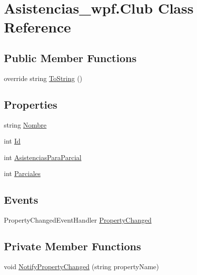 \hypertarget{class_asistencias__wpf_1_1_club}{\section{Asistencias\-\_\-wpf.\-Club Class Reference}
\label{class_asistencias__wpf_1_1_club}
}
\subsection*{Public Member Functions}
\begin{DoxyCompactItemize}
\item 
override string \hyperlink{class_asistencias__wpf_1_1_club_aa94008b53cde5a248b0149566e527ac0}{To\-String} ()
\end{DoxyCompactItemize}
\subsection*{Properties}
\begin{DoxyCompactItemize}
\item 
string \hyperlink{class_asistencias__wpf_1_1_club_a0da21bbffe8ac3d877a51c03899bf8c2}{Nombre}
\item 
int \hyperlink{class_asistencias__wpf_1_1_club_a25ec9c585f6874004dc690ea2641ab0d}{Id}
\item 
int \hyperlink{class_asistencias__wpf_1_1_club_a1855a7a63b6465ef490871f93d385a69}{Asistencias\-Para\-Parcial}
\item 
int \hyperlink{class_asistencias__wpf_1_1_club_a9f825c0495aa564e915d0f1a9e082186}{Parciales}
\end{DoxyCompactItemize}
\subsection*{Events}
\begin{DoxyCompactItemize}
\item 
Property\-Changed\-Event\-Handler \hyperlink{class_asistencias__wpf_1_1_club_a1980fc9a90add0431cbf22f8a000cbf9}{Property\-Changed}
\end{DoxyCompactItemize}
\subsection*{Private Member Functions}
\begin{DoxyCompactItemize}
\item 
void \hyperlink{class_asistencias__wpf_1_1_club_ada28fd62b53b97acbe638c27f1a87f38}{Notify\-Property\-Changed} (string property\-Name)
\end{DoxyCompactItemize}

